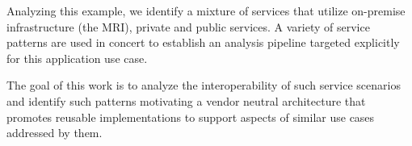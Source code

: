 Analyzing this example, we identify a mixture of services that utilize
on-premise infrastructure (the MRI), private and public services. A
variety of service patterns are used in concert to establish an analysis
pipeline targeted explicitly for this application use case. 

The goal of this work is to analyze the interoperability of such
service scenarios and identify such patterns motivating a vendor
neutral architecture that promotes reusable implementations to 
support aspects of similar use cases addressed by them.
